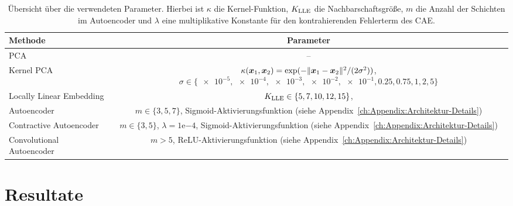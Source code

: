 \begin{table}[ht]
	\tymax=300pt
	\centering
	\begin{tabulary}{\linewidth}{LC}
		\toprule
		Methode                            & Parameter                                                            \\ \midrule
		PCA      & --                                                                   \\
		Kernel PCA                         & $\kappa(\bm{x}_1, \bm{x}_2) = \exp(- \lVert\bm{x}_1 - \bm{x}_2\rVert^2/(2\sigma^2))$, $\sigma \in \{\num{e-5},\num{e-4}, \num{e-3}, \num{e-2}, \num{e-1}, 0.25, 0.75, 1, 2, 5\}$ \\
		Locally Linear Embedding     & $K_{\text{LLE}} \in \{ 5, 7, 10, 12, 15\}$,                      \\
		Autoencoder                  & $m \in \{3, 5, 7\}$, Sigmoid-Aktivierungsfunktion \newline (siehe
		Appendix~\ref{ch:Appendix:Architektur-Details})                                                           \\  Contractive Autoencoder & $m \in \{3, 5\}$, $\lambda=1\mathrm{e}{-4}$,
		Sigmoid-Aktivierungsfunktion (siehe Appendix~\ref{ch:Appendix:Architektur-Details})                       \\
		Convolutional Autoencoder & $m > 5$, ReLU-Aktivierungsfunktion \newline (siehe
		Appendix~\ref{ch:Appendix:Architektur-Details})                                                           \\ \bottomrule
	\end{tabulary}
	\caption[Übersicht über die verwendeten Parameter der Methoden]{Übersicht über die verwendeten Parameter. Hierbei ist $\kappa$ die Kernel-Funktion, $K_{\text{LLE}}$ die Nachbarschaftsgröße, $m$ die Anzahl der Schichten im Autoencoder und $\lambda$ eine multiplikative Konstante für den kontrahierenden Fehlerterm des CAE.}
	\label{tab:uebersicht-parameter}
\end{table}
\section{Resultate}
\label{ch:Vergleich:sec:Resultate}

